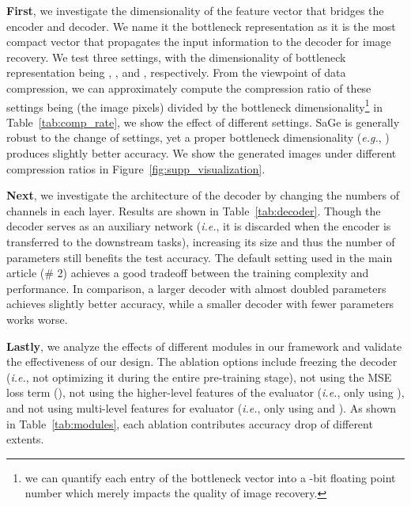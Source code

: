 \documentclass[10pt,twocolumn,letterpaper]{article}
\begin{document}
\textbf{First}, we investigate the dimensionality of the  feature vector that bridges the encoder and decoder. We name it the bottleneck representation as it is the most compact vector that propagates the input information to the decoder for image recovery. We test three settings, with the dimensionality of bottleneck representation being , , and , respectively. From the viewpoint of data compression, we can approximately compute the compression ratio of these settings being  (the image pixels) divided by the bottleneck dimensionality\footnote{we can quantify each entry of the bottleneck vector into a -bit floating point number which merely impacts the quality of image recovery.} in Table~\ref{tab:comp_rate}, we show the effect of different settings. SaGe is generally robust to the change of settings, yet a proper bottleneck dimensionality (\textit{e.g.}, ) produces slightly better accuracy. We show the generated images under different compression ratios in Figure~\ref{fig:supp_visualization}.

\textbf{Next}, we investigate the architecture of the decoder by changing the numbers of channels in each layer. Results are shown in Table~\ref{tab:decoder}. Though the decoder serves as an auxiliary network (\textit{i.e.}, it is discarded when the encoder is transferred to the downstream tasks), increasing its size and thus the number of parameters still benefits the test accuracy. The default setting used in the main article (\# 2) achieves a good tradeoff between the training complexity and performance. In comparison, a larger decoder with almost doubled parameters achieves slightly better accuracy, while a smaller decoder with  fewer parameters works worse.

\textbf{Lastly}, we analyze the effects of different modules in our framework and validate the effectiveness of our design. The ablation options include freezing the decoder (\textit{i.e.}, not optimizing it during the entire pre-training stage), not using the MSE loss term (), not using the higher-level features of the evaluator (\textit{i.e.}, only using ), and not using multi-level features for evaluator (\textit{i.e.}, only using  and ). As shown in Table~\ref{tab:modules}, each ablation contributes accuracy drop of different extents.
\end{document}
